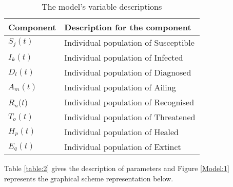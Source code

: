 \documentclass{article}
\begin{document}
\begin{table}[h!]
\centering
\begin{tabular}{ |p{2cm}|p{6cm}|  } 
 \hline
\textbf{Component}  & \textbf{Description for the component} \\[0.5ex]
 \hline
$ S_j(t)$  & Individual population of Susceptible  \\
\hline
$I_k(t)$  & Individual population of Infected  \\
\hline
$D_l(t)$  & Individual population of Diagnosed  \\
\hline
$A_m(t)$  & Individual population of Ailing  \\
\hline
$R_n(t$)  & Individual population of Recognised  \\
\hline
$T_o(t)$  & Individual population of Threatened  \\
\hline
$H_p(t)$  & Individual population of Healed  \\
\hline
$E_q(t)$  & Individual population of Extinct  \\[1ex] 
 \hline
\end{tabular}
\caption{The model's variable descriptions}
\label{table:1}
\end{table}

Table \ref{table:2} gives the description of parameters and Figure \ref{Model:1} represents the graphical scheme representation below.
\end{document}
